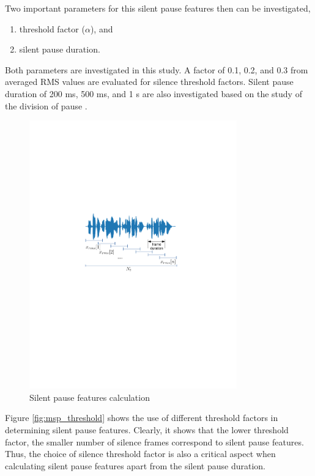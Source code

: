 Two important parameters for this silent pause features then can be
investigated,
\begin{enumerate}
  \item threshold factor ($\alpha$), and
  \item silent pause duration.
\end{enumerate}
Both parameters are investigated in this study. A factor of 0.1, 0.2, and 0.3 
from averaged RMS values are evaluated for silence threshold factors.
Silent pause duration of 200 ms, 500 ms, and 1 s are also investigated based 
on the study of the division of pause \cite{Campione2002}.

\begin{figure}[htbp]
  \centering
  \includegraphics[width=0.8\textwidth]{../fig/silence_fig.pdf}
  \caption{Silent pause features calculation}
  \label{fig:silence_fig}
\end{figure}

Figure \ref{fig:msp_threshold} shows the use of different threshold factors 
in determining silent pause features. Clearly, it shows that the lower 
threshold factor, the smaller number of silence frames correspond to 
silent pause features. Thus, the choice of silence threshold factor 
is also a critical aspect when calculating silent pause features 
apart from the silent pause duration.

